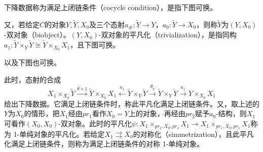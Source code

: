 下降数据称为满足上闭链条件（cocycle condition），是指下图可换。
\begin{center}
\end{center}

又，若给定$C$的对象$Y,\tilde Y,X_0$及三个态射$a_\#:\tilde Y\to Y$，$a_0:\tilde Y\to X_0$，则称$\tilde Y$为$(Y,X_0)$-双对象（biobject）。$(Y,X_0)$-双对象的平凡化（trivialization），是指同构$a_1:\tilde Y\times_Y\tilde Y\cong\tilde Y\times_{X_0}X_1$，且下图可换。
\begin{center}
\end{center}
以及下图也可换。
\begin{center}
\end{center}

此时，态射的合成
\[
X_1\times_{X_0}\tilde Y\xrightarrow{\theta\times1}\tilde Y\times_{X_0}X_1\xleftarrow{a_1}\tilde Y\times_Y\tilde Y\xrightarrow{\theta_{\tilde Y}}\tilde Y\times_Y\tilde Y\xrightarrow{a_1}Y\times_{X_0}X_1
\]
给出下降数据。它满足上闭链条件时，称此平凡化满足上闭链条件。又，取上述的$Y$为$X_0$的情形，把$X_1$经由$pr_1$看作$X_0=Y$上的对象，再经由$pr_2$赋予$a_0$-结构，则$X_1$可看作$(X_0,X_0)$-双对象。此时的平凡化$\psi:X_1\times_{pr_2,X_0,pr_1}X_1\to X_1\times_{pr_1,X_0,pr_1}X_1$称为 1-单纯对象的平凡化。若给定$X_1\rightrightarrows X_0$的对称化（simmetrization），且此平凡化满足上闭链条件，则称为满足上闭链条件的对称 1-单纯对象。

